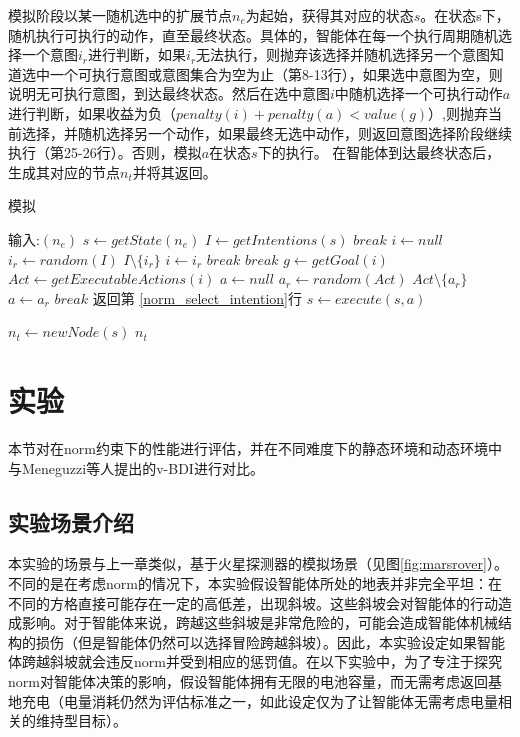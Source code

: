 模拟阶段以某一随机选中的扩展节点$n_e$为起始，获得其对应的状态$s$。在状态s下，随机执行可执行的动作，直至最终状态。具体的，智能体在每一个执行周期随机选择一个意图$i_r$进行判断，如果$i_r$无法执行，则抛弃该选择并随机选择另一个意图知道选中一个可执行意图或意图集合为空为止（第8-13行），如果选中意图为空，则说明无可执行意图，到达最终状态。然后在选中意图$i$中随机选择一个可执行动作$a$进行判断，如果收益为负（$penalty(i)+penalty(a) < value(g)$）,则抛弃当前选择，并随机选择另一个动作，如果最终无选中动作，则返回意图选择阶段继续执行（第25-26行）。否则，模拟$a$在状态$s$下的执行。 在智能体到达最终状态后，生成其对应的节点$n_t$并将其返回。

\begin{algorithm}[H]
\caption{模拟}\label{norm_simulate}
\begin{algorithmic}[1]
\STATE 输入:$(n_e)$
\STATE $s \gets getState(n_e)$
  \STATE $I \gets getIntentions(s)$
    \STATE $break$
  \ENDIF
  \STATE $i \gets null$\label{norm_select_intention}
    \STATE $i_r \gets random(I)$
    \STATE $I \setminus \{i_r\}$
      \STATE $i \gets i_r$
      \STATE $break$
    \ENDIF
  \ENDWHILE
    \STATE $break$
  \ENDIF
  \STATE $g \gets getGoal(i)$
  \STATE $Act \gets getExecutableActions(i)$
  \STATE $a \gets null$
    \STATE $a_r \gets random(Act)$
    \STATE $Act \setminus \{a_r\}$
      \STATE $a \gets a_r$
      \STATE $break$
    \ENDIF
  \ENDWHILE
    \STATE 返回第 \ref{norm_select_intention}行
  \ENDIF
  \STATE $s \gets execute(s, a)$
\ENDWHILE

\STATE $n_t \gets newNode(s)$
\RETURN $n_t$
\end{algorithmic}
\end{algorithm}

\section{实验}
本节对\SAN 在norm约束下的性能进行评估，并在不同难度下的静态环境和动态环境中与Meneguzzi等人\cite{DBLP:journals/eaai/MeneguzziROVL15}提出的v-BDI进行对比。
\subsection{实验场景介绍}
本实验的场景与上一章类似，基于火星探测器的模拟场景（见图\ref{fig:marsrover}）。不同的是在考虑norm的情况下，本实验假设智能体所处的地表并非完全平坦：在不同的方格直接可能存在一定的高低差，出现斜坡。这些斜坡会对智能体的行动造成影响。对于智能体来说，跨越这些斜坡是非常危险的，可能会造成智能体机械结构的损伤（但是智能体仍然可以选择冒险跨越斜坡）。因此，本实验设定如果智能体跨越斜坡就会违反norm并受到相应的惩罚值。在以下实验中，为了专注于探究norm对智能体决策的影响，假设智能体拥有无限的电池容量，而无需考虑返回基地充电（电量消耗仍然为评估标准之一，如此设定仅为了让智能体无需考虑电量相关的维持型目标）。

